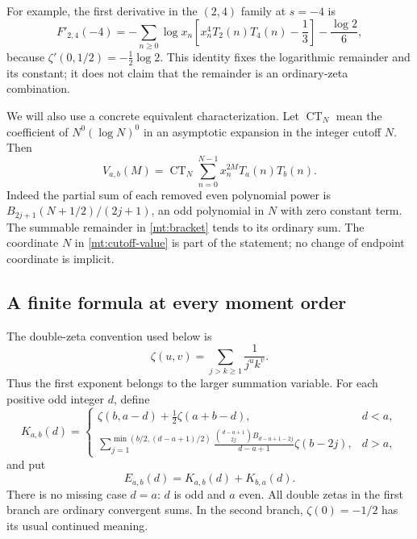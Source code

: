 \documentclass[11pt,letterpaper]{article}
\numberwithin{equation}{section}
\theoremstyle{plain}
\theoremstyle{definition}
\theoremstyle{remark}
\begin{document}
For example, the first derivative in the $(2,4)$ family at $s=-4$ is
\begin{equation}\label{mt:derivative-example}
 F'_{2,4}(-4)=
 -\sum_{n\geq0}\log x_n
        \left[x_n^4T_2(n)T_4(n)-\frac13\right]
 -\frac{\log 2}{6},
\end{equation}
because $\zeta'(0,1/2)=-\tfrac12\log2$. This identity fixes the
logarithmic remainder and its constant; it does not claim that the
remainder is an ordinary-zeta combination.

We will also use a concrete equivalent characterization. Let
$\operatorname{CT}_N$ mean the coefficient of $N^0(\log N)^0$ in
an asymptotic expansion in the integer cutoff $N$. Then
\begin{equation}\label{mt:cutoff-value}
 V_{a,b}(M)=\operatorname{CT}_N
   \sum_{n=0}^{N-1}x_n^{2M}T_a(n)T_b(n).
\end{equation}
Indeed the partial sum of each removed even polynomial power is
$B_{2j+1}(N+1/2)/(2j+1)$, an odd polynomial in $N$ with zero constant
term. The summable remainder in \eqref{mt:bracket} tends to its ordinary
sum. The coordinate $N$ in \eqref{mt:cutoff-value} is part of the
statement; no change of endpoint coordinate is implicit.

\subsection{A finite formula at every moment order}

The double-zeta convention used below is
\[
 \zeta(u,v)=\sum_{j>k\ge1}\frac1{j^u k^v}.
\]
Thus the first exponent belongs to the larger summation variable.
For each positive odd integer $d$, define
\begin{equation}\label{mt:oriented}
 K_{a,b}(d)=
 \begin{cases}
  \displaystyle\zeta(b,a-d)+\frac12\zeta(a+b-d),&d<a,\\[2mm]
  \displaystyle\sum_{j=1}^{\min(b/2,(d-a+1)/2)}
    \frac{\binom{d-a+1}{2j}B_{d-a+1-2j}}{d-a+1}
             \zeta(b-2j),&d>a,
 \end{cases}
\end{equation}
and put
\begin{equation}\label{mt:E}
 E_{a,b}(d)=K_{a,b}(d)+K_{b,a}(d).
\end{equation}
There is no missing case $d=a$: $d$ is odd and $a$ even. All double
zetas in the first branch are ordinary convergent sums. In the second
branch, $\zeta(0)=-1/2$ has its usual continued meaning.
\end{document}
